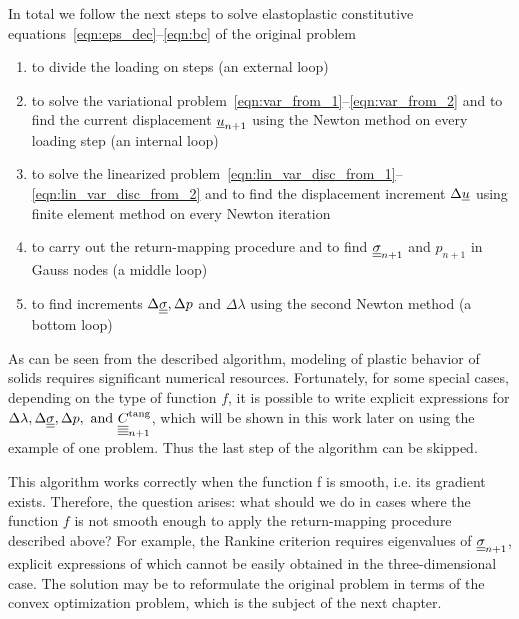\documentclass[12pt]{article}
\begin{document}
In total we follow the next steps to solve elastoplastic constitutive equations~\ref{eqn:eps_dec}--\ref{eqn:bc} of the original problem
\begin{enumerate}
    \item to divide the loading on steps (an external loop)
    \item to solve the variational problem~\ref{eqn:var_from_1}--\ref{eqn:var_from_2} and to find the current displacement $\underline{u}_{n+1}$ using the Newton method on every loading step (an internal loop)
    \item to solve the linearized problem~\ref{eqn:lin_var_disc_from_1}--\ref{eqn:lin_var_disc_from_2} and to find the displacement increment $\Delta\underline{u}$ using finite element method on every Newton iteration
    \item to carry out the return-mapping procedure and to find $\underline{\underline{\sigma}}_{n+1}$ and $p_{n+1}$ in Gauss nodes (a middle loop)
    \item to find increments $\Delta\underline{\underline{\sigma}}, \Delta p$ and $\Delta\lambda$ using the second Newton method (a bottom loop)
\end{enumerate}

As can be seen from the described algorithm, modeling of plastic behavior of solids requires significant numerical resources. Fortunately, for some special cases, depending on the type of function $f$, it is possible to write explicit expressions for $\Delta\lambda, \Delta\underline{\underline{\sigma}}, \Delta p,  \text{ and } \underline{\underline{\underline{\underline{C_{}}}}}_{n+1}^\text{tang}$, which will be shown in this work later on using the example of one problem. Thus the last step of the algorithm can be skipped.



This algorithm works correctly when the function f is smooth, i.e. its gradient exists. Therefore, the question arises: what should we do in cases where the function $f$ is not smooth enough to apply the return-mapping procedure described above? For example, the Rankine criterion requires eigenvalues of $\underline{\underline{\sigma}}_{n+1}$, explicit expressions of which cannot be easily obtained in the three-dimensional case. The solution may be to reformulate the original problem in terms of the convex optimization problem, which is the subject of the next chapter.
\end{document}
